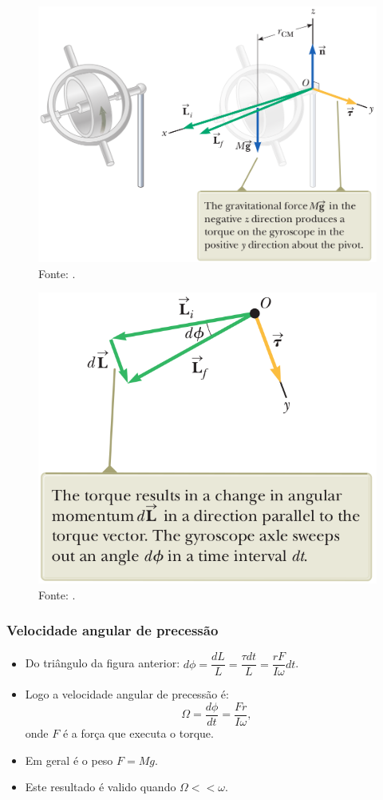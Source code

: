 \documentclass{beamer}
\begin{document}
\begin{frame}
\begin{figure}
\includegraphics[width=3.6 in]{figuras/giroscopio1.png}
\caption{Fonte: \cite{Serway2014}.}
\end{figure}
\end{frame}


\begin{frame}
\begin{figure}
\includegraphics[width=3.4 in]{figuras/giroscopio2.png}
\caption{Fonte: \cite{Serway2014}.}
\end{figure}
\end{frame}


\begin{frame}
\frametitle{Velocidade angular de precessão}
\begin{itemize}
\item Do triângulo da figura anterior: {\color{red}$d\phi = \dfrac{dL}{L} = \dfrac{\tau dt}{L} = \dfrac{r F  }{I \omega}dt$}.
\item Logo a velocidade angular de precessão é:
{\color{red}\begin{equation}
\Omega = \dfrac{d\phi}{dt} = \dfrac{F r}{I \omega}, \nonumber
\end{equation}}
onde {\color{red}$F$} é a força que executa o torque.
\item Em geral é o peso {\color{red}$F=Mg$}.
\item Este resultado é valido quando {\color{red}$\Omega << \omega$}.
\end{itemize}
\end{frame}
\end{document}

